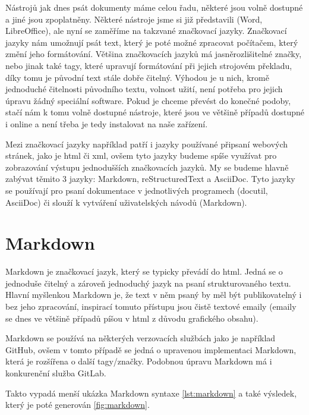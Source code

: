 Nástrojů jak dnes psát dokumenty máme celou řadu, některé jsou volně dostupné a jiné jsou zpoplatněny. Některé nástroje jsme si již představili (Word, LibreOffice), ale
nyní se zaměříme na takzvané značkovací jazyky. Značkovací jazyky nám umožnují psát text, který je poté možné zpracovat počítačem, který změní jeho formátování. Většina
značkovacích jazyků má jasně\linebreak rozlišitelné značky, nebo jinak také tagy, které upravují formátování při jejich strojovém překladu, díky tomu je původní text stále dobře čitelný.
\cite{markup} Výhodou je u nich, kromě jednoduché čitelnosti původního textu, volnost užití, není potřeba pro jejich úpravu žádný speciální software. Pokud je chceme převést do
konečné podoby, stačí nám k tomu volně dostupné nástroje, které jsou ve většině případů dostupné i online a není třeba je tedy instalovat na naše zařízení.

Mezi značkovací jazyky například patří i jazyky používané při\linebreak psaní webových stránek, jako je \gls{html} či \gls{xml}, ovšem tyto jazyky budeme spíše využívat pro zobrazování výstupu
jednodušších značkovacích jazyků. My se budeme hlavně zabývat těmito 3 jazyky: Markdown, reStructuredText a AsciiDoc. Tyto jazyky se používají pro psaní dokumentace v jednotlivých programech
(docutil, AsciiDoc) či slouží k vytváření uživatelských návodů (Markdown).

\clearpage

\section{Markdown}

Markdown je značkovací jazyk, který se typicky převádí do \gls{html}. Jedná se o jednoduše čitelný a zároveň jednoduchý jazyk na psaní strukturovaného textu. Hlavní myšlenkou Markdown je, že
text v něm psaný by měl být publikovatelný i bez jeho zpracování, inspirací tomuto přístupu jsou čistě textové emaily (emaily se dnes ve většině případů píšou v \gls{html}
z důvodu grafického obsahu). \cite{markdown}

Markdown se používá na některých verzovacích službách jako je například GitHub, ovšem v tomto případě se jedná o upravenou implementaci Markdown, která je rozšířena o další
tagy/značky. Podobnou úpravu Markdown má i konkurenční služba GitLab.

Takto vypadá menší ukázka Markdown syntaxe \ref{lst:markdown} a také výsledek, který je poté generován \ref{fig:markdown}.

